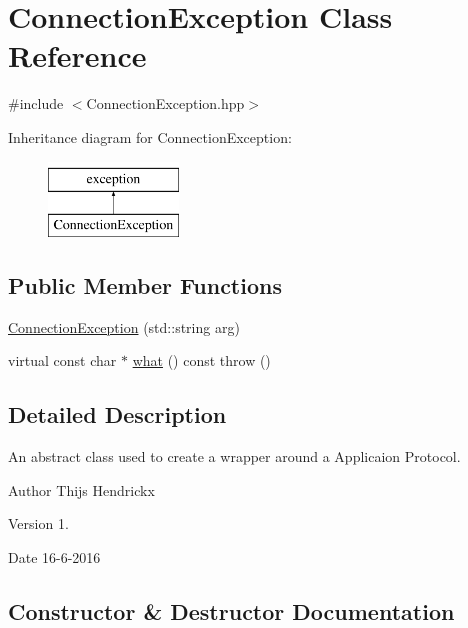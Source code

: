 \hypertarget{class_connection_exception}{}\section{Connection\+Exception Class Reference}
\label{class_connection_exception}


{\ttfamily \#include $<$Connection\+Exception.\+hpp$>$}

Inheritance diagram for Connection\+Exception\+:\begin{figure}[H]
\begin{center}
\leavevmode
\includegraphics[height=2.000000cm]{class_connection_exception}
\end{center}
\end{figure}
\subsection*{Public Member Functions}
\begin{DoxyCompactItemize}
\item 
\hyperlink{class_connection_exception_ab4dd2e1058fb571fce2f9fea06a61403}{Connection\+Exception} (std\+::string arg)
\item 
virtual const char $\ast$ \hyperlink{class_connection_exception_a046e901d8e5fd6a893ae13640fab21bf}{what} () const   throw ()
\end{DoxyCompactItemize}


\subsection{Detailed Description}
An abstract class used to create a wrapper around a Applicaion Protocol. \begin{DoxyAuthor}{Author}
Thijs Hendrickx 
\end{DoxyAuthor}
\begin{DoxyVersion}{Version}
1. 
\end{DoxyVersion}
\begin{DoxyDate}{Date}
16-\/6-\/2016 
\end{DoxyDate}


\subsection{Constructor \& Destructor Documentation}
\hypertarget{class_connection_exception_ab4dd2e1058fb571fce2f9fea06a61403}{}
